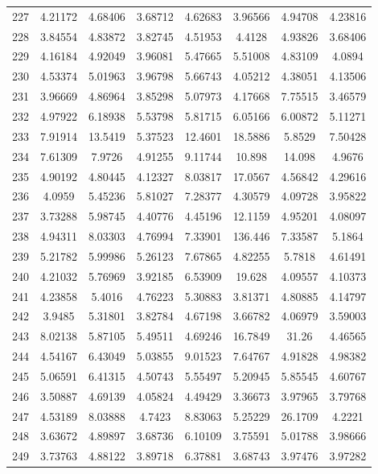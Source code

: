 \begin{center}
\begin{longtable}{cccccccc}
227 & 4.21172 & 4.68406 & 3.68712 & 4.62683 & 3.96566 & 4.94708 & 4.23816\\
228 & 3.84554 & 4.83872 & 3.82745 & 4.51953 & 4.4128 & 4.93826 & 3.68406\\
229 & 4.16184 & 4.92049 & 3.96081 & 5.47665 & 5.51008 & 4.83109 & 4.0894\\
230 & 4.53374 & 5.01963 & 3.96798 & 5.66743 & 4.05212 & 4.38051 & 4.13506\\
231 & 3.96669 & 4.86964 & 3.85298 & 5.07973 & 4.17668 & 7.75515 & 3.46579\\
232 & 4.97922 & 6.18938 & 5.53798 & 5.81715 & 6.05166 & 6.00872 & 5.11271\\
233 & 7.91914 & 13.5419 & 5.37523 & 12.4601 & 18.5886 & 5.8529 & 7.50428\\
234 & 7.61309 & 7.9726 & 4.91255 & 9.11744 & 10.898 & 14.098 & 4.9676\\
235 & 4.90192 & 4.80445 & 4.12327 & 8.03817 & 17.0567 & 4.56842 & 4.29616\\
236 & 4.0959 & 5.45236 & 5.81027 & 7.28377 & 4.30579 & 4.09728 & 3.95822\\
237 & 3.73288 & 5.98745 & 4.40776 & 4.45196 & 12.1159 & 4.95201 & 4.08097\\
238 & 4.94311 & 8.03303 & 4.76994 & 7.33901 & 136.446 & 7.33587 & 5.1864\\
239 & 5.21782 & 5.99986 & 5.26123 & 7.67865 & 4.82255 & 5.7818 & 4.61491\\
240 & 4.21032 & 5.76969 & 3.92185 & 6.53909 & 19.628 & 4.09557 & 4.10373\\
241 & 4.23858 & 5.4016 & 4.76223 & 5.30883 & 3.81371 & 4.80885 & 4.14797\\
242 & 3.9485 & 5.31801 & 3.82784 & 4.67198 & 3.66782 & 4.06979 & 3.59003\\
243 & 8.02138 & 5.87105 & 5.49511 & 4.69246 & 16.7849 & 31.26 & 4.46565\\
244 & 4.54167 & 6.43049 & 5.03855 & 9.01523 & 7.64767 & 4.91828 & 4.98382\\
245 & 5.06591 & 6.41315 & 4.50743 & 5.55497 & 5.20945 & 5.85545 & 4.60767\\
246 & 3.50887 & 4.69139 & 4.05824 & 4.49429 & 3.36673 & 3.97965 & 3.79768\\
247 & 4.53189 & 8.03888 & 4.7423 & 8.83063 & 5.25229 & 26.1709 & 4.2221\\
248 & 3.63672 & 4.89897 & 3.68736 & 6.10109 & 3.75591 & 5.01788 & 3.98666\\
249 & 3.73763 & 4.88122 & 3.89718 & 6.37881 & 3.68743 & 3.97476 & 3.97282\\

\end{longtable}
\end{center}
